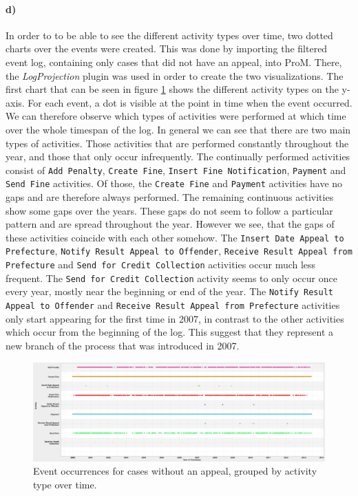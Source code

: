\documentclass[12pt]{report}
\begin{document}
\paragraph{\textbf{d)}} In order to to be able to see the different activity types over time, two dotted charts over the events were created. This was done by importing the filtered event log, containing only cases that did not have an appeal, into ProM. There, the \emph{LogProjection} plugin was used in order to create the two visualizations. The first chart that can be seen in figure \ref{fig:dotted_timestamp} shows the different activity types on the y-axis.
For each event, a dot is visible at the point in time when the event occurred. We can therefore observe which types of activities were performed at which time over the whole timespan of the log. In general we can see that there are two main types of activities. Those activities that are performed constantly throughout the year, and those that only occur infrequently. The continually performed activities consist of \texttt{Add Penalty}, \texttt{Create Fine}, \texttt{Insert Fine Notification}, \texttt{Payment} and \texttt{Send Fine} activities. Of those, the \texttt{Create Fine} and \texttt{Payment} activities have no gaps and are therefore always performed. The remaining continuous activities show some gaps over the years. These gaps do not seem to follow a particular pattern and are spread throughout the year. However we see, that the gaps of these activities coincide with each other somehow. The \texttt{Insert Date Appeal to Prefecture}, \texttt{Notify Result Appeal to Offender}, \texttt{Receive Result Appeal from Prefecture} and \texttt{Send for Credit Collection} activities occur much less frequent. The \texttt{Send for Credit Collection} activity seems to only occur once every year, mostly near the beginning or end of the year. The \texttt{Notify Result Appeal to Offender} and \texttt{Receive Result Appeal from Prefecture} activities only start appearing for the first time in 2007, in contrast to the other activities which occur from the beginning of the log. This suggest that they represent a new branch of the process that was introduced in 2007.
\begin{figure}[H]
  \centering
  \includegraphics[width=\textwidth]{figures/dotted_timestamp.png}
  \caption{Event occurrences for cases without an appeal, grouped by activity type over time.}
  \label{fig:dotted_timestamp}
\end{figure}
\end{document}
